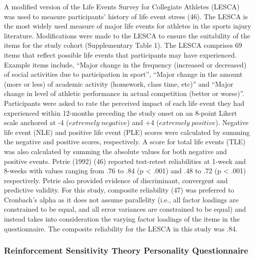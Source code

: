 \documentclass[
  english,
  man]{apa6}
\begin{document}
A modified version of the Life Events Survey for Collegiate Athletes (LESCA) was used to measure participants' history of life event stress (46).
The LESCA is the most widely used measure of major life events for athletes in the sports injury literature.
Modifications were made to the LESCA to ensure the suitability of the items for the study cohort (Supplementary Table 1).
The LESCA comprises 69 items that reflect possible life events that participants may have experienced.
Example items include, ``Major change in the frequency (increased or decreased) of social activities due to participation in sport'', ``Major change in the amount (more or less) of academic activity (homework, class time, etc)'' and ``Major change in level of athletic performance in actual competition (better or worse)''.
Participants were asked to rate the perceived impact of each life event they had experienced within 12-months preceding the study onset on an 8-point Likert scale anchored at -4 (\(extremely\;negative\)) and +4 (\(extremely\;positive\)).
Negative life event (NLE) and positive life event (PLE) scores were calculated by summing the negative and positive scores, respectively.
A score for total life events (TLE) was also calculated by summing the absolute values for both negative and positive events.
Petrie (1992) (46) reported test-retest reliabilities at 1-week and 8-weeks with values ranging from .76 to .84 (p \textless{} .001) and .48 to .72 (p \textless{} .001) respectively.
Petrie also provided evidence of discriminant, convergent and predictive validity.
For this study, composite reliability (47) was preferred to Cronbach's alpha as it does not assume parallelity (i.e., all factor loadings are constrained to be equal, and all error variances are constrained to be equal) and instead takes into consideration the varying factor loadings of the items in the questionnaire.
The composite reliability for the LESCA in this study was .84.

\hypertarget{reinforcement-sensitivity-theory-personality-questionnaire}{%
\subsubsection{Reinforcement Sensitivity Theory Personality Questionnaire}\label{reinforcement-sensitivity-theory-personality-questionnaire}}
\end{document}
